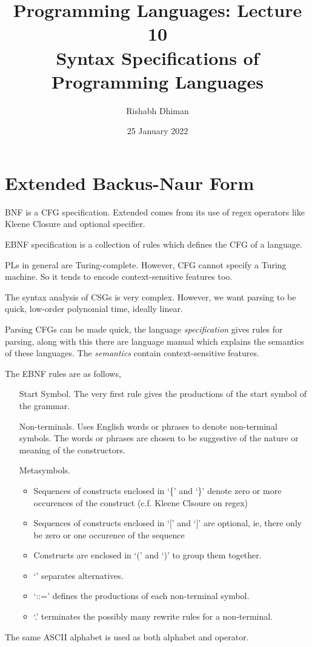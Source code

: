 \documentclass[a4paper]{scrartcl}
\title{
	Programming Languages: Lecture 10\\
	Syntax Specifications of Programming Languages
}
\author{Rishabh Dhiman}
\date{25 January 2022}
\theoremstyle{definition}
\begin{document}
\maketitle

\section{Extended Backus-Naur Form}
BNF is a CFG specification. Extended comes from its use of regex operators like Kleene Closure and optional specifier.

EBNF specification is a collection of rules which defines the CFG of a language.

PLs in general are Turing-complete. However, CFG cannot specify a Turing machine. So it tends to encode context-sensitive features too.

The syntax analysis of CSGs is very complex.
However, we want parsing to be quick, low-order polynomial time, ideally linear.

Parsing CFGs can be made quick, the language \emph{specification} gives rules for parsing, along with this there are language manual which explains the semantics of these languages. The \emph{semantics} contain context-sensitive features.

The EBNF rules are as follows,
\begin{enumerate}
	\item[Start Symbol.] The very first rule gives the productions of the start symbol of the grammar.
	\item[Non-terminals.] Uses English words or phrases to denote non-terminal symbols. The words or phrases are chosen to be suggestive of the nature or meaning of the constructors.
	\item[Metasymbols.]
		\begin{itemize}
			\item Sequences of constructs enclosed in `\{' and `\}' denote zero or more occurences of the construct (c.f. Kleene Clsoure on regex)
			\item Sequences of constructs enclosed in `[' and `]' are optional, ie, there only be zero or one occurence of the sequence
			\item Constructs are enclosed in `(' and `)' to group them together.
			\item `\textbar' separates alternatives.
			\item `::=' defines the productions of each non-terminal symbol.
			\item `.' terminates the possibly many rewrite rules for a non-terminal.
		\end{itemize}
\end{enumerate}
The same ASCII alphabet is used as both alphabet and operator.
\end{document}
